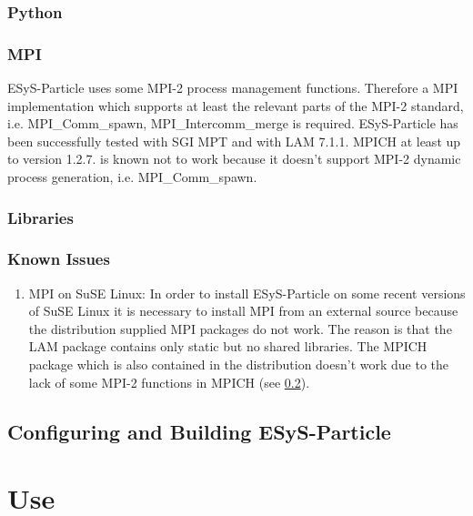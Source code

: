 \documentclass{manual}
\begin{document}
\subsection{Python}


\subsection{MPI}

\label{subsection::mpi}

ESyS-Particle uses some MPI-2 process management functions. Therefore a MPI implementation which supports at least the relevant parts of the MPI-2 standard, i.e. {\sf MPI_Comm_spawn, MPI_Intercomm_merge} is required. ESyS-Particle has been successfully tested with SGI MPT and with LAM 7.1.1. MPICH at least up to version 1.2.7. is known not to work because it doesn't support MPI-2 dynamic process generation, i.e. {\sf MPI_Comm_spawn}.

\subsection{Libraries}

\subsection{Known Issues}
\begin{enumerate}
\item MPI on SuSE Linux: In order to install ESyS-Particle on some recent versions of SuSE Linux it is necessary to install MPI from an external source because the distribution supplied MPI packages do not work. The reason is that the LAM package contains only static but no shared libraries. The MPICH package which is also contained in the distribution doesn't work due to the lack of some MPI-2 functions in MPICH (see \ref{subsection::mpi}).
\end{enumerate}

\section{Configuring and Building ESyS-Particle}

\chapter{Use}
\end{document}
